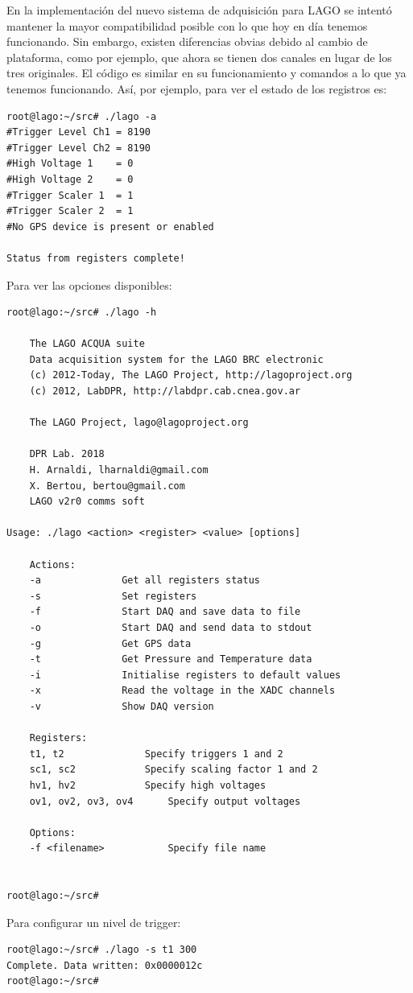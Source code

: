 \documentclass[a4paper,11pt]{article}
\begin{document}
En la implementación del nuevo sistema de adquisición para LAGO se intentó
mantener la mayor compatibilidad posible con lo que hoy en día tenemos
funcionando. Sin embargo, existen diferencias obvias debido al cambio de
plataforma, como por ejemplo, que ahora se tienen dos canales en
lugar de los tres originales. El código es similar en su
funcionamiento y comandos a lo que ya tenemos funcionando. Así, por
ejemplo, para ver el estado de los registros es:

\begin{verbatim}
root@lago:~/src# ./lago -a
#Trigger Level Ch1 = 8190
#Trigger Level Ch2 = 8190
#High Voltage 1    = 0 
#High Voltage 2    = 0
#Trigger Scaler 1  = 1
#Trigger Scaler 2  = 1
#No GPS device is present or enabled

Status from registers complete!
\end{verbatim}

\noindent Para ver las opciones disponibles:
\begin{verbatim}
root@lago:~/src# ./lago -h

	The LAGO ACQUA suite
	Data acquisition system for the LAGO BRC electronic
	(c) 2012-Today, The LAGO Project, http://lagoproject.org
	(c) 2012, LabDPR, http://labdpr.cab.cnea.gov.ar

	The LAGO Project, lago@lagoproject.org

	DPR Lab. 2018
	H. Arnaldi, lharnaldi@gmail.com
	X. Bertou, bertou@gmail.com
	LAGO v2r0 comms soft

Usage: ./lago <action> <register> <value> [options]

	Actions:
	-a				Get all registers status
	-s				Set registers
	-f				Start DAQ and save data to file
	-o				Start DAQ and send data to stdout
	-g				Get GPS data
	-t				Get Pressure and Temperature data
	-i				Initialise registers to default values
	-x				Read the voltage in the XADC channels
	-v				Show DAQ version

	Registers:
	t1, t2				Specify triggers 1 and 2
	sc1, sc2			Specify scaling factor 1 and 2
	hv1, hv2			Specify high voltages
	ov1, ov2, ov3, ov4		Specify output voltages

	Options:
	-f <filename>			Specify file name


root@lago:~/src# 

\end{verbatim}

\noindent Para configurar un nivel de trigger:
\begin{verbatim}
root@lago:~/src# ./lago -s t1 300
Complete. Data written: 0x0000012c
root@lago:~/src# 
\end{verbatim}
\end{document}
